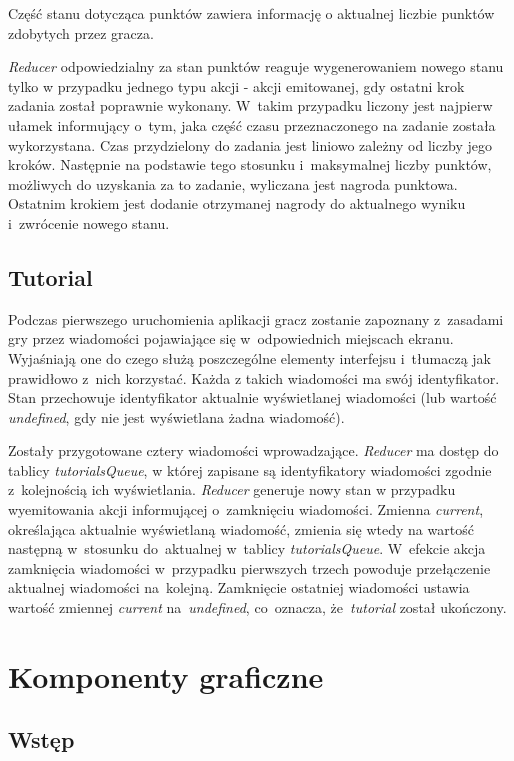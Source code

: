 \documentclass[12pt,a4paper,polish,thesis]{dcsbook}
\begin{document}
{	Część stanu dotycząca punktów zawiera informację o aktualnej liczbie punktów zdobytych przez gracza.
	
	\textit{Reducer} odpowiedzialny za stan punktów reaguje wygenerowaniem nowego stanu tylko w przypadku jednego typu akcji - akcji emitowanej, gdy ostatni krok zadania został poprawnie wykonany. W~takim przypadku liczony jest najpierw ułamek informujący o~tym, jaka część czasu przeznaczonego na zadanie została wykorzystana. Czas przydzielony do zadania jest liniowo zależny od liczby jego kroków. Następnie na podstawie tego stosunku i~maksymalnej liczby punktów, możliwych do uzyskania za to zadanie, wyliczana jest nagroda punktowa. Ostatnim krokiem jest dodanie otrzymanej nagrody do aktualnego wyniku i~zwrócenie nowego stanu.
	
	\subsection{Tutorial} \label{TutorialStan}
	
	Podczas pierwszego uruchomienia aplikacji gracz zostanie zapoznany z~zasadami gry przez wiadomości pojawiające się w~odpowiednich miejscach ekranu. Wyjaśniają one do czego służą poszczególne elementy interfejsu i~tłumaczą jak prawidłowo z~nich korzystać. Każda z takich wiadomości ma swój identyfikator. Stan przechowuje identyfikator aktualnie wyświetlanej wiadomości (lub wartość \textit{undefined}, gdy nie jest wyświetlana żadna wiadomość).
	
	Zostały przygotowane cztery wiadomości wprowadzające. \textit{Reducer} ma dostęp do tablicy \textit{tutorialsQueue}, w której zapisane są identyfikatory wiadomości zgodnie z~kolejnością ich wyświetlania. \textit{Reducer} generuje nowy stan w przypadku wyemitowania akcji informującej o~zamknięciu wiadomości. Zmienna \textit{current}, określająca aktualnie wyświetlaną wiadomość, zmienia się wtedy na wartość następną w~stosunku do~aktualnej w~tablicy \textit{tutorialsQueue}. W~efekcie akcja zamknięcia wiadomości w~przypadku pierwszych trzech powoduje przełączenie aktualnej wiadomości na~kolejną. Zamknięcie ostatniej wiadomości ustawia wartość zmiennej \textit{current} na~\textit{undefined}, co~oznacza, że~\textit{tutorial} został ukończony.

	\section{Komponenty graficzne}

	\subsection{Wstęp}

}
\end{document}
